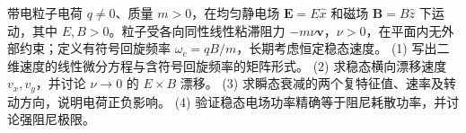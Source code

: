 带电粒子电荷 \(q\ne0\)、质量 \(m>0\)，在均匀静电场 \(\mathbf E=E\hat x\) 和磁场 \(\mathbf B=B\hat z\) 下运动，其中 \(E,B>0\)。粒子受各向同性线性粘滞阻力 \(-m\nu\mathbf v\)，\(\nu>0\)，在平面内无外部约束；定义有符号回旋频率 \(\omega_c=qB/m\)，长期考虑恒定稳态速度。
(1) 写出二维速度的线性微分方程与含符号回旋频率的矩阵形式。
(2) 求稳态横向漂移速度 \(v_x,v_y\)，并讨论 \(\nu\to0\) 的 \(E\times B\) 漂移。
(3) 求瞬态衰减的两个复特征值、速率及转动方向，说明电荷正负影响。
(4) 验证稳态电场功率精确等于阻尼耗散功率，并讨论强阻尼极限。
